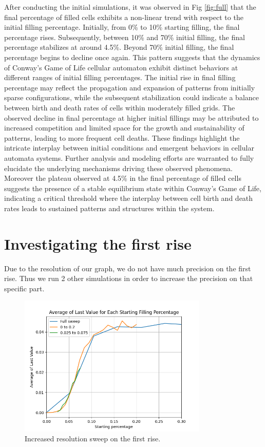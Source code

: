\documentclass{article}
\begin{document}
After conducting the initial simulations, it was observed in Fig \ref*{fig:full} that the final percentage 
of filled cells exhibits a non-linear trend with respect to the initial filling percentage. 
Initially, from 0\% to 10\% starting filling, the final percentage rises. 
Subsequently, between 10\% and 70\% initial filling, the final percentage stabilizes 
at around 4.5\%. Beyond 70\% initial filling, the final percentage begins to decline 
once again. This pattern suggests that the dynamics of Conway's Game of Life cellular 
automaton exhibit distinct behaviors at different ranges of initial filling percentages. 
The initial rise in final filling percentage may reflect the propagation and expansion of 
patterns from initially sparse configurations, while the subsequent stabilization could 
indicate a balance between birth and death rates of cells within moderately filled grids. 
The observed decline in final percentage at higher initial fillings may be attributed to 
increased competition and limited space for the growth and sustainability of patterns, 
leading to more frequent cell deaths. These findings highlight the intricate interplay 
between initial conditions and emergent behaviors in cellular automata systems. Further 
analysis and modeling efforts are warranted to fully elucidate the underlying mechanisms 
driving these observed phenomena. Moreover the plateau observed at 4.5\% in the final 
percentage of filled cells suggests the presence of a stable equilibrium state within 
Conway's Game of Life, indicating a critical threshold where the interplay between cell 
birth and death rates leads to sustained patterns and structures within the system.

\section{Investigating the first rise}
Due to the resolution of our graph, we do not have much precision on the first rise. Thus
we run 2 other simulations in order to increase the precision on that specific part.


\begin{figure}[htbp]
    \centering
    \includegraphics[width=0.8\textwidth]{res/sweep_zoom.png}
    \caption{Increased resolution sweep on the first rise.}
    \label{fig:sweep_zoom}
\end{figure}
\end{document}
